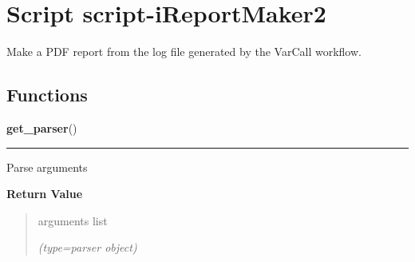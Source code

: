 %
%
%


\section{Script script-iReportMaker2}

    \label{script-iReportMaker2}
Make a PDF report from the log file generated by the VarCall workflow.



  \subsection{Functions}

    \label{script-iReportMaker2:get_parser}

    \vspace{0.5ex}

\hspace{.8\funcindent}\begin{boxedminipage}{\funcwidth}

    \raggedright \textbf{get\_parser}()

    \vspace{-1.5ex}

    \rule{\textwidth}{0.5\fboxrule}
\setlength{\parskip}{2ex}
    Parse arguments

\setlength{\parskip}{1ex}
      \textbf{Return Value}
    \vspace{-1ex}

      \begin{quote}
      arguments list

      {\it (type=parser object)}

      \end{quote}

    \end{boxedminipage}

